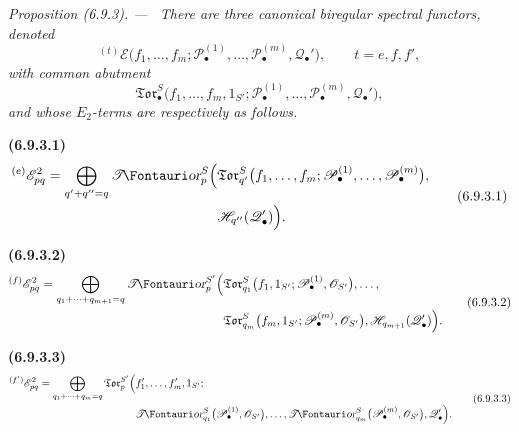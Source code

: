 \documentclass[10pt,oneside]{book}
\newcommand{\sh}[1]{\mathscr{#1}}
\newcommand{\shTor}{\sh{T}\textup{\kern-2.2pt{\Fontauri\slshape or}}}
\newcommand{\oldpage}[2][]{\setcounter{footnote}{0}\marginpar{\scriptsize\textbf{#1}~|~#2}\ignorespaces}
\newenvironment{env}[1][]{\par\medskip\noindent\textbf{(#1)}\ }{\par}
\newenvironment{proposition}[1][]{\par\medskip\noindent\itshape Proposition (#1). ---\ }{\par}
\begin{document}
\begin{proposition}[6.9.3]
\label{III.6.9.3}
There are three canonical biregular spectral functors, denoted
\[
  {}^{(t)}\sh E
  \bigl(
    f_1,\ldots,f_m;
    \sh P_\bullet^{(1)},\ldots,\sh P_\bullet^{(m)},
    \sh Q_\bullet'
  \bigr),
  \qquad
  t=e,f,f',
\]
with common abutment
\[
  \mathfrak{Tor}_\bullet^S
  \bigl(
    f_1,\ldots,f_m,1_{S'};
    \sh P_\bullet^{(1)},\ldots,\sh P_\bullet^{(m)},
    \sh Q_\bullet'
  \bigr),
\]
and whose $E_2$-terms are respectively as follows.

\oldpage[III]{167}

\begin{env}[6.9.3.1]
\label{III.6.9.3.1}
\[
\begin{split}
  {}^{(e)}\sh E_{pq}^2
  =
  \bigoplus_{q'+q''=q}
  \shTor_p^S
  \Bigl(
    &
    \mathfrak{Tor}_{q'}^S
    \bigl(
      f_1,\ldots,f_m;
      \sh P_\bullet^{(1)},\ldots,\sh P_\bullet^{(m)}
    \bigr),
    \\
    &
    \sh H_{q''}(\sh Q_\bullet')
  \Bigr).
\end{split}
  \tag{6.9.3.1}\label{III.6.9.3.1.eq}
\]
\end{env}

\begin{env}[6.9.3.2]
\label{III.6.9.3.2}
\[
\begin{split}
  {}^{(f)}\sh E_{pq}^2
  =
  \bigoplus_{q_1+\cdots+q_{m+1}=q}
  \shTor_p^{S'}
  \Bigl(
    &
    \mathfrak{Tor}_{q_1}^S
    \bigl(
      f_1,1_{S'};
      \sh P_\bullet^{(1)},\sh O_{S'}
    \bigr),
    \ldots,
    \\
    &
    \mathfrak{Tor}_{q_m}^S
    \bigl(
      f_m,1_{S'};
      \sh P_\bullet^{(m)},\sh O_{S'}
    \bigr),
    \sh H_{q_{m+1}}(\sh Q_\bullet')
  \Bigr).
\end{split}
  \tag{6.9.3.2}\label{III.6.9.3.2.eq}
\]
\end{env}

\begin{env}[6.9.3.3]
\label{III.6.9.3.3}
\[
\begin{split}
  {}^{(f')}\sh E_{pq}^2
  =
  \bigoplus_{q_1+\cdots+q_m=q}
  \mathfrak{Tor}_p^{S'}
  \Bigl(
    &
    f_1',\ldots,f_m',1_{S'};
    \\
    &
    \shTor_{q_1}^S
    \bigl(
      \sh P_\bullet^{(1)},\sh O_{S'}
    \bigr),
    \ldots,
    \shTor_{q_m}^S
    \bigl(
      \sh P_\bullet^{(m)},\sh O_{S'}
    \bigr),
    \sh Q_\bullet'
  \Bigr).
\end{split}
  \tag{6.9.3.3}\label{III.6.9.3.3.eq}
\]
\end{env}
\end{proposition}
\end{document}

